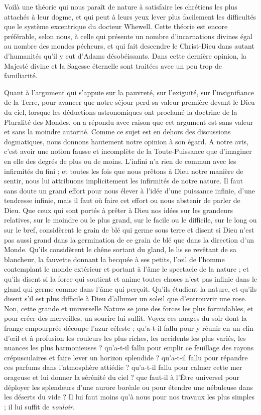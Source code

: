 \documentclass[a4paper, 11pt, oneside]{article}
\begin{document}
Voilà une théorie qui nous paraît de nature à satisfaire les chrétiens les plus attachés à leur dogme, et qui peut à leurs yeux lever plus facilement les difficultés que le système excentrique du docteur Whewell. Cette théorie est encore préférable, selon nous, à celle qui présente un nombre d'incarnations divines égal au nombre des mondes pécheurs, et qui fait descendre le Christ-Dieu dans autant d'humanités qu'il y eut d'Adams désobéissants. Dans cette dernière opinion, la Majesté divine et la Sagesse éternelle sont traitées avec un peu trop de familiarité.

Quant à l'argument qui s'appuie sur la pauvreté, sur l'exiguïté, sur l'insignifiance de la Terre, pour avancer que notre séjour perd sa valeur première devant le Dieu du ciel, lorsque les déductions astronomiques ont proclamé la doctrine de la Pluralité des Mondes, on a répondu avec raison que cet argument est sans valeur et sans la moindre autorité. Comme ce sujet est en dehors des discussions dogmatiques, nous donnons hautement notre opinion à son égard. A notre avis, c'est avoir une notion fausse et incomplète de la Toute-Puissance que d'imaginer en elle des degrés de plus ou de moins. L'infini n'a rien de commun avec les infirmités du fini ; et toutes les fois que nous prêtons à Dieu notre manière de sentir, nous lui attribuons implicitement les infirmités de notre nature. Il faut sans doute un grand effort pour nous élever à l'idée d'une puissance infinie, d'une tendresse infinie, mais il faut où faire cet effort ou nous abstenir de parler de Dieu. Que ceux qui sont portés à prêter à Dieu nos idées sur les grandeurs relatives, sur le moindre ou le plus grand, sur le facile ou le difficile, sur le long ou sur le bref, considèrent le grain de blé qui germe sous terre et disent si Dieu n'est pas aussi grand dans la germination de ce grain de blé que dans la direction d'un Monde. Qu'ils considèrent le chêne sortant du gland, le lis se revêtant de sa blancheur, la fauvette donnant la becquée à ses petits, l'œil de l'homme contemplant le monde extérieur et portant à l'âme le spectacle de la nature ; et qu'ils disent si la force qui soutient et anime toutes choses n'est pas infinie dans le gland qui germe comme dans l'âme qui perçoit. Qu'ils étudient la nature, et qu'ils disent s'il est plus difficile à Dieu d'allumer un soleil que d'entrouvrir une rose. Non, cette grande et universelle Nature se joue des forces les plus formidables, et pour créer des merveilles, un sourire lui suffit. Voyez ces nuages du soir dont la frange empourprée découpe l'azur céleste ; qu'a-t-il fallu pour y réunir en un clin d'œil et à profusion les couleurs les plus riches, les accidents les plus variés, les nuances les plus harmonieuses ? qu'a-t-il fallu pour emplir ce feuillage des rayons crépusculaires et faire lever un horizon splendide ? qu'a-t-il fallu pour répandre ces parfums dans l'atmosphère attiédie ? qu'a-t-il fallu pour calmer cette mer orageuse et lui donner la sérénité du ciel ? que faut-il à l'Être universel pour déployer les splendeurs d'une aurore boréale ou pour étendre une nébuleuse dans les déserts du vide ? Il lui faut moins qu'à nous pour nos travaux les plus simples ; il lui suffit de \emph{vouloir}.
\end{document}
